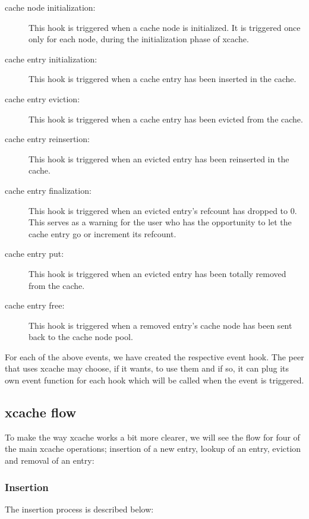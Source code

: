 \begin{description}
\item[cache node initialization:]
	This hook is triggered when a cache node is initialized. It is 
	triggered once only for each node, during the initialization phase of 
	xcache.
\item[cache entry initialization:]
	This hook is triggered when a cache entry has been inserted in the 
	cache.
\item[cache entry eviction:]
	This hook is triggered when a cache entry has been evicted from the 
	cache.
\item[cache entry reinsertion:]
	This hook is triggered when an evicted entry has been reinserted in the 
	cache.
\item[cache entry finalization:]
	This hook is triggered when an evicted entry's refcount has dropped to 
	0. This serves as a warning for the user who has the opportunity to let 
	the cache entry go or increment its refcount.
\item[cache entry put:]
	This hook is triggered when an evicted entry has been totally removed 
	from the cache.
\item[cache entry free:]
	This hook is triggered when a removed entry's cache node has been sent 
	back to the cache node pool.
\end{description}

For each of the above events, we have created the respective event hook. The 
peer that uses xcache may choose, if it wants, to use them and if so, it can 
plug its own event function for each hook which will be called when the event 
is triggered.

\subsection{xcache flow}\label{sec:xcache-flow-design}

To make the way xcache works a bit more clearer, we will see the flow for four 
of the main xcache operations; insertion of a new entry, lookup of an entry, 
eviction and removal of an entry:

\subsubsection{Insertion}

The insertion process is described below:

